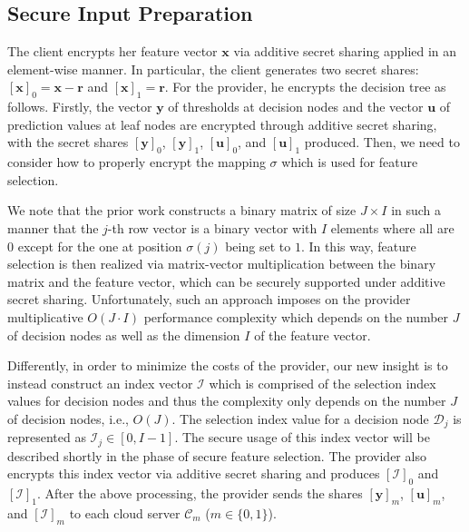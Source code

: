 \documentclass[10pt,journal,compsoc]{IEEEtran}
\begin{document}
\subsection{Secure Input Preparation}
\label{subsec:secure-input-preparation}



The client encrypts her feature vector $\mathbf{x}$ via additive secret sharing applied in an element-wise manner. 
%
In particular, the client generates two secret shares: $[\mathbf{x}]_0=\mathbf{x}-\mathbf{r}$ and $[\mathbf{x}]_1=\mathbf{r}$.
%
For the provider, he encrypts the decision tree as follows.
%
Firstly, the vector $\mathbf{y}$ of thresholds at decision nodes and the vector $\mathbf{u}$ of prediction values at leaf nodes are encrypted through additive secret sharing, with the secret shares $[\mathbf{y}]_0$, $[\mathbf{y}]_1$, $[\mathbf{u}]_0$, and $[\mathbf{u}]_1$ produced.
%
Then, we need to consider how to properly encrypt the mapping $\sigma$ which is used for feature selection.
%



We note that the prior work \cite{ZhengDWWN20} constructs a binary matrix of size $J \times I$ in such a manner that the $j$-th row vector is a binary vector with $I$ elements where all are $0$ except for the one at position $\sigma(j)$ being set to $1$.
%
In this way, feature selection is then realized via matrix-vector multiplication between the binary matrix and the feature vector, which can be securely supported under additive secret sharing.
%
Unfortunately, such an approach imposes on the provider multiplicative $O(J \cdot I)$ performance complexity which depends on the number $J$ of decision nodes as well as the dimension $I$ of the feature vector.


Differently, in order to minimize the costs of the provider, our new insight is to instead construct an index vector $\mathcal{I}$ which is comprised of the selection index values for decision nodes and thus the complexity only depends on the number $J$ of decision nodes, i.e., $O(J)$. 
%
The selection index value for a decision node $\mathcal{D}_j$ is represented as $\mathcal{I}_j\in [0,I-1]$.
%
The secure usage of this index vector will be described shortly in the phase of secure feature selection. 
%
The provider also encrypts this index vector via additive secret sharing and produces $[\mathcal{I}]_0$ and $[\mathcal{I}]_1$.
%
After the above processing, the provider sends the shares $[\mathbf{y}]_m$, $[\mathbf{u}]_m$, and $[\mathcal{I}]_m$ to each cloud server $\mathcal{C}_m$ ($m\in \{0,1\}$).
\end{document}
